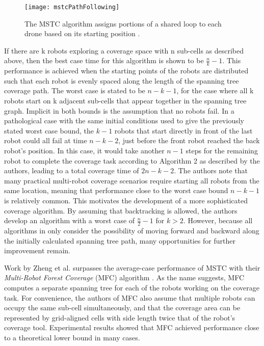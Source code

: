 \begin{figure}[H]
\texttt{[image: mstcPathFollowing]}
\caption[MSTC Path Following Behavior]{The MSTC algorithm assigns portions of a shared loop to each drone based on its starting position \cite{Hazon}.}
\end{figure}

If there are k robots exploring a coverage space with n sub-cells as described above, then the best case time for this algorithm is shown to be $ \frac{n}{k} - 1 $. This performance is achieved when the starting points of the robots are distributed such that each robot is evenly spaced along the length of the spanning tree coverage path. The worst case is stated to be $ n - k - 1$, for the case where all k robots start on k adjacent sub-cells that appear together in the spanning tree graph. Implicit in both bounds is the assumption that no robots fail. In a pathological case with the same initial conditions used to give the previously stated worst case bound, the $ k - 1$ robots that start directly in front of the last robot could all fail at time $ n - k - 2$, just before the front robot reached the back robot's position. In this case, it would take another $n - 1$  steps for the remaining robot to complete the coverage task according to Algorithm 2 as described by the authors, leading to a total coverage time of $ 2 n - k - 2 $. The authors note that many practical multi-robot coverage scenarios require starting all robots from the same location, meaning that performance close to the worst case bound $ n - k - 1 $ is relatively common. This motivates the development of a more sophisticated coverage algorithm. By assuming that backtracking is allowed, the authors develop an algorithm with a worst case of $ \frac{n}{2} - 1 $ for $ k > 2 $. However, because all algorithms in \cite{Hazon} only consider the possibility of moving forward and backward along the initially calculated spanning tree path, many opportunities for further improvement remain.

Work by Zheng et al. surpasses the average-case performance of MSTC with their \textit{Multi-Robot Forest Coverage} (MFC) algorithm \cite{Zheng}. As the name suggests, MFC computes a separate spanning tree for each of the robots working on the coverage task. For convenience, the authors of MFC also assume that multiple robots can occupy the same sub-cell simultaneously, and that the coverage area can be represented by grid-aligned cells with side length twice that of the robot's coverage tool. Experimental results showed that MFC achieved performance close to a theoretical lower bound in many cases.

